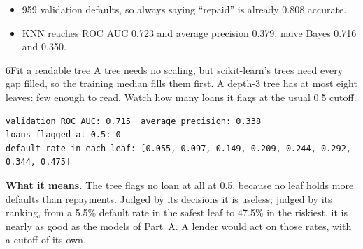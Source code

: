 \begin{labcheckpoint}
\begin{itemize}[leftmargin=1.2em,itemsep=2pt,topsep=1pt]
  \item 959 validation defaults, so always saying ``repaid'' is already 0.808 accurate.
  \item KNN reaches ROC AUC 0.723 and average precision 0.379; naive Bayes 0.716 and 0.350.
\end{itemize}
\end{labcheckpoint}


\begin{labquestion}{6}{Fit a readable tree}
A tree needs no scaling, but scikit-learn's trees need every gap filled, so the training median fills them first. A depth-3 tree has at most eight leaves: few enough to read. Watch how many loans it flags at the usual 0.5 cutoff.
\end{labquestion}
\begin{labanswer}

\begin{refoutput}
\begin{lstlisting}[style=utpterminal]
validation ROC AUC: 0.715  average precision: 0.338
loans flagged at 0.5: 0
default rate in each leaf: [0.055, 0.097, 0.149, 0.209, 0.244, 0.292, 0.344, 0.475]
\end{lstlisting}
\end{refoutput}

\textbf{What it means.} The tree flags no loan at all at 0.5, because no leaf holds more defaults than repayments. Judged by its decisions it is useless; judged by its ranking, from a 5.5\% default rate in the safest leaf to 47.5\% in the riskiest, it is nearly as good as the models of Part~A. A lender would act on those rates, with a cutoff of its own.
\end{labanswer}

